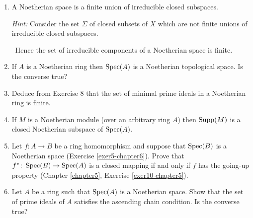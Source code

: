 \begin{enumerate}
    \item \label{exer7-chapter6}A Noetherian space is a finite union of irreducible closed subspaces. 
    
    \textit{Hint: } Consider the set $\Sigma$ of closed subsets of $X$ which are not finite unions of irreducible closed subspaces.
    
    \quad\, Hence the set of irreducible components of a Noetherian space is finite.

    \item \label{exer8-chapter6}If $A$ is a Noetherian ring then $\operatorname{Spec}(A)$ is a Noetherian topological space. Is the converse true?

    \item \label{exer9-chapter6}Deduce from Exercise 8 that the set of minimal prime ideals in a Noetherian ring is finite.

    \item \label{exer10-chapter6}If $M$ is a Noetherian module (over an arbitrary ring $A$) then $\operatorname{Supp}(M)$ is a closed Noetherian subspace of $\operatorname{Spec}(A)$.

    \item \label{exer11-chapter6}Let $f \colon A \to B$ be a ring homomorphism and suppose that $\operatorname{Spec}(B)$ is a Noetherian space (Exercise \ref{exer5-chapter6}). Prove that $f^* \colon \operatorname{Spec}(B) \to \operatorname{Spec}(A)$ is a closed mapping if and only if $f$ has the going-up property (Chapter \ref{chapter5}, Exercise \ref{exer10-chapter5}).

    \item \label{exer12-chapter6}Let $A$ be a ring such that $\operatorname{Spec}(A)$ is a Noetherian space. Show that the set of prime ideals of $A$ satisfies the ascending chain condition. Is the converse true?
\end{enumerate}
